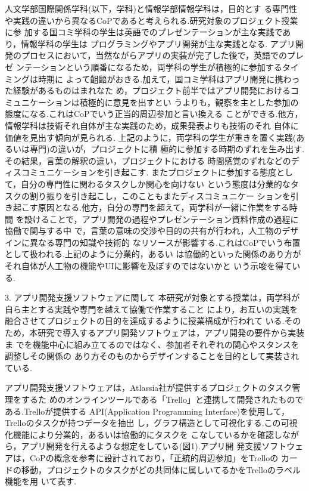 \documentclass[submit,techrep]{ipsj}
\begin{document}
人文学部国際関係学科(以下，学科)と情報学部情報学科は，目的とす る専門性や実践の違いから異なるCoPであると考えられる.研究対象のプロジェクト授業に参 加する国コミ学科の学生は英語でのプレゼンテーションが主な実践であり，情報学科の学生は プログラミングやアプリ開発が主な実践となる.  アプリ開発のプロセスにおいて，当然ながらアプリの実装が完了した後で，英語でのプレゼ ンテーションという順番になるため，両学科の学生が積極的に参加するタイミングは時期に よって齟齬がおきる.加えて，国コミ学科はアプリ開発に携わった経験があるものはまれなた め，プロジェクト前半ではアプリ開発におけるコミュニケーションは積極的に意見を出すとい うよりも，観察を主とした参加の態度になる.これはCoPでいう正当的周辺参加と言い換える ことができる.他方，情報学科は技術それ自体が主な実践のため，成果発表よりも技術のそれ 自体に価値を見出す傾向が見られる.  上記のように，両学科の学生が重きを置く実践(あるいは専門)の違いが，プロジェクトに積 極的に参加する時期のずれを生み出す.その結果，言葉の解釈の違い，プロジェクトにおける 時間感覚のずれなどのディスコミュニケーションを引き起こす.  またプロジェクトに参加する態度として，自分の専門性に関わるタスクしか関心を向けない という態度は分業的なタスクの割り振りを引き起こし，このこともまたディスコミュニケー ションを引き起こす原因となる.他方，自分の専門を超えて，両学科が一緒に作業をする時間 を設けることで，アプリ開発の過程やプレゼンテーション資料作成の過程に協働で関与する中 で，言葉の意味の交渉や目的の共有が行われ，人工物のデザインに異なる専門の知識や技術的 なリソースが影響する.これはCoPでいう布置として扱われる.上記のように分業的，あるい は協働的といった関係のあり方がそれ自体が人工物の機能やUIに影響を及ぼすのではないかと いう示唆を得ている.


3. アプリ開発支援ソフトウェアに関して  本研究が対象とする授業は，両学科が自ら主とする実践や専門を越えて協働で作業すること により，お互いの実践を融合させてプロジェクトの目的を達成するように授業構成が行われて いる.そのため，本研究で導入するアプリ開発ソフトウェアは，アプリ開発の要件から実装ま でを機能中心に組み立てるのではなく、参加者それぞれの関心やスタンスを調整しその関係の あり方そのものからデザインすることを目的として実装されている.


 アプリ開発支援ソフトウェアは，Atlassia社が提供するプロジェクトのタスク管理をするた めのオンラインツールである「Trello」と連携して開発されたものである.Trelloが提供する API(Application Programming Interface)を使用して，Trelloのタスクが持つデータを抽出 し，グラフ構造として可視化する.この可視化機能により分業的，あるいは協働的にタスクを こなしているかを確認しながら，アプリ開発を行えるような想定をしている(図1).アプリ開 発支援ソフトウェアは，CoPの概念を参考に設計されており，「正統的周辺参加」をTrelloの カードの移動，プロジェクトのタスクがどの共同体に属しいてるかをTrelloのラベル機能を用 いて表す.
\end{document}
